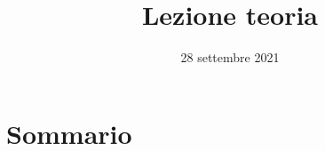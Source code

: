 \documentclass[xcolor={dvipsnames, svgnames, x11names, table}, 10pt]{beamer}
\title{Lezione teoria}
\date{28 settembre 2021}
\begin{document}
\frame{\titlepage}

\section*{Sommario}
\begin{frame}
    \tableofcontents[pausesections]
\end{frame}
\end{document}
